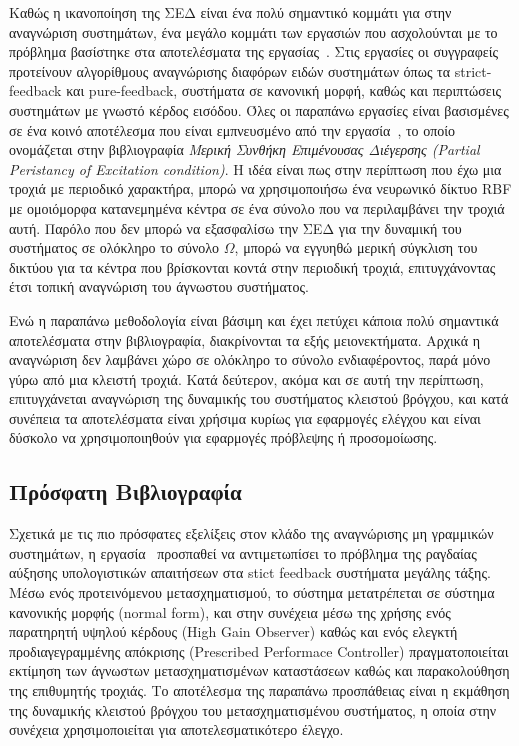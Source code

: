 Καθώς η ικανοποίηση της ΣΕΔ είναι ένα πολύ σημαντικό κομμάτι για στην αναγνώριση συστημάτων, ένα μεγάλο κομμάτι των εργασιών που ασχολούνται με το πρόβλημα βασίστηκε στα αποτελέσματα της εργασίας~\cite{kurdila1995persistency}. Στις εργασίες \cite{wang2003deterministic,wang2004learning,wang2006learning,liu2006learning,liu2007learning,liu2009learning,wang2012learning,wang2012learningpure,wang2013identification,dai2014dynamic,wang2014dynamic,wang2015learning} οι συγγραφείς προτείνουν αλγορίθμους αναγνώρισης διαφόρων ειδών συστημάτων όπως τα strict-feedback και pure-feedback, συστήματα σε κανονική μορφή, καθώς και περιπτώσεις συστημάτων με γνωστό κέρδος εισόδου. Όλες οι παραπάνω εργασίες είναι βασισμένες σε ένα κοινό αποτέλεσμα που είναι εμπνευσμένο από την εργασία~\cite{kurdila1995persistency}, το οποίο ονομάζεται στην βιβλιογραφία \textit{Μερική Συνθήκη Επιμένουσας Διέγερσης (Partial Peristancy of Excitation condition)}. Η ιδέα είναι πως στην περίπτωση που έχω μια τροχιά με περιοδικό χαρακτήρα, μπορώ να χρησιμοποιήσω ένα νευρωνικό δίκτυο RBF με ομοιόμορφα κατανεμημένα κέντρα σε ένα σύνολο που να περιλαμβάνει την τροχιά αυτή. Παρόλο που δεν μπορώ να εξασφαλίσω την ΣΕΔ για την δυναμική του συστήματος σε ολόκληρο το σύνολο $\Omega$, μπορώ να εγγυηθώ μερική σύγκλιση του δικτύου για τα κέντρα που βρίσκονται κοντά στην περιοδική τροχιά, επιτυγχάνοντας έτσι τοπική αναγνώριση του άγνωστου συστήματος.

Ενώ η παραπάνω μεθοδολογία είναι βάσιμη και έχει πετύχει κάποια πολύ σημαντικά αποτελέσματα στην βιβλιογραφία, διακρίνονται τα εξής μειονεκτήματα. Αρχικά η αναγνώριση δεν λαμβάνει χώρο σε ολόκληρο το σύνολο ενδιαφέροντος, παρά μόνο γύρω από μια κλειστή τροχιά. Κατά δεύτερον, ακόμα και σε αυτή την περίπτωση, επιτυγχάνεται αναγνώριση της δυναμικής του συστήματος κλειστού βρόγχου, και κατά συνέπεια τα αποτελέσματα είναι χρήσιμα κυρίως για εφαρμογές ελέγχου και είναι δύσκολο να χρησιμοποιηθούν για εφαρμογές πρόβλεψης ή προσομοίωσης.

\subsection{Πρόσφατη Βιβλιογραφία}
Σχετικά με τις πιο πρόσφατες εξελίξεις στον κλάδο της αναγνώρισης μη γραμμικών συστημάτων, η εργασία~\cite{wang2016dynamic} προσπαθεί να αντιμετωπίσει το πρόβλημα της ραγδαίας αύξησης υπολογιστικών απαιτήσεων στα stict feedback συστήματα μεγάλης τάξης. Μέσω ενός προτεινόμενου μετασχηματισμού, το σύστημα μετατρέπεται σε σύστημα κανονικής μορφής (normal form), και στην συνέχεια μέσω της χρήσης ενός παρατηρητή υψηλού κέρδους (High Gain Observer) καθώς και ενός ελεγκτή προδιαγεγραμμένης απόκρισης (Prescribed Performace Controller) πραγματοποιείται εκτίμηση των άγνωστων μετασχηματισμένων καταστάσεων καθώς και παρακολούθηση της επιθυμητής τροχιάς. Το αποτέλεσμα της παραπάνω προσπάθειας είναι η εκμάθηση της δυναμικής κλειστού βρόγχου του μετασχηματισμένου συστήματος, η οποία στην συνέχεια χρησιμοποιείται για αποτελεσματικότερο έλεγχο.

